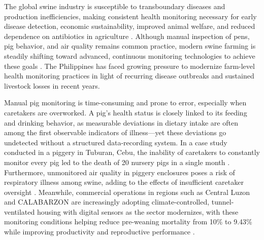 The global swine industry is susceptible to transboundary diseases and production inefficiencies, making consistent health monitoring necessary for early disease detection, economic sustainability, improved animal welfare, and reduced dependence on antibiotics in agriculture \cite{beyondtech2025smart}. Although manual inspection of pens, pig behavior, and air quality remains common practice, modern swine farming is steadily shifting toward advanced, continuous monitoring technologies to achieve these goals \cite{beyondtech2025smart}. The Philippines has faced growing pressure to modernize farm-level health monitoring practices in light of recurring disease outbreaks and sustained livestock losses in recent years.

Manual pig monitoring is time-consuming and prone to error, especially when caretakers are overworked. A pig's health status is closely linked to its feeding and drinking behavior, as measurable deviations in dietary intake are often among the first observable indicators of illness---yet these deviations go undetected without a structured data-recording system. In a case study conducted in a piggery in Tuburan, Cebu, the inability of caretakers to constantly monitor every pig led to the death of 20 nursery pigs in a single month \cite{dingcong2017monitoring}. Furthermore, unmonitored air quality in piggery enclosures poses a risk of respiratory illness among swine, adding to the effects of insufficient caretaker oversight \cite{lo2025rebooting,livestockproduction2026}. Meanwhile, commercial operations in regions such as Central Luzon and CALABARZON are increasingly adopting climate-controlled, tunnel-ventilated housing with digital sensors as the sector modernizes, with these monitoring conditions helping reduce pre-weaning mortality from 10\% to 9.43\% while improving productivity and reproductive performance \cite{lo2025rebooting,livestockproduction2026}.
